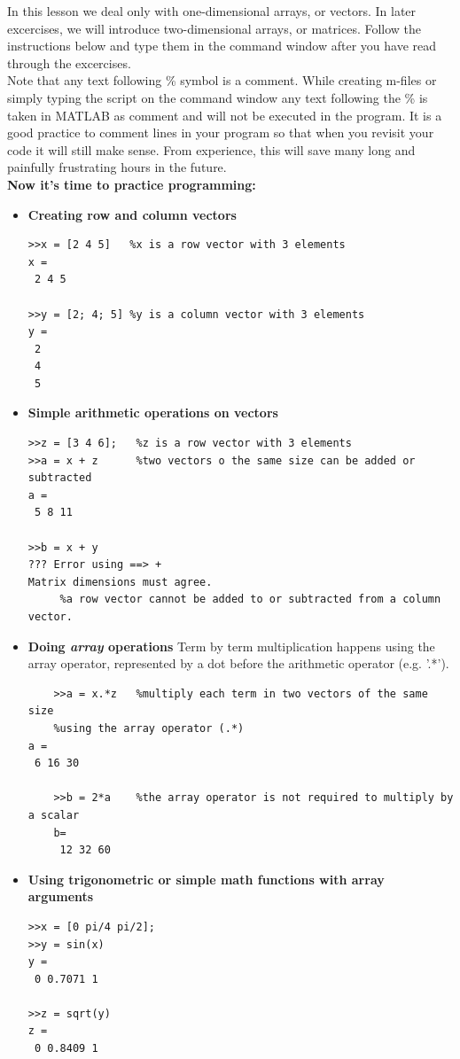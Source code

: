 \documentclass[paper=a4, fontsize=11pt]{scrartcl} %
\numberwithin{equation}{section} %
\numberwithin{figure}{section} %
\numberwithin{table}{section} %
\begin{document}
In this lesson we deal only with one-dimensional arrays, or vectors.
In later excercises, we will introduce two-dimensional arrays, or matrices. 
Follow the instructions below and type them in the command window after you have read through the excercises.\\

Note that any text following \% symbol is a comment. 
While creating m-files or simply typing
the script on the command window any text following the \% is taken in MATLAB as comment and will not be executed in the program. 
It is a good practice to comment lines in your program so that when you revisit your code it will still make sense. 
From experience, this will save many long and painfully frustrating hours in the future.\\

\textbf{Now it's time to practice programming:}

\begin{itemize}
\item \textbf{Creating row and column vectors}
\begin{verbatim}
>>x = [2 4 5]	%x is a row vector with 3 elements
x =
 2 4 5
 
>>y = [2; 4; 5]	%y is a column vector with 3 elements
y =
 2
 4
 5 
\end{verbatim}

\item \textbf{Simple arithmetic operations on vectors}
\begin{verbatim}
>>z = [3 4 6];	 %z is a row vector with 3 elements
>>a = x + z		 %two vectors o the same size can be added or subtracted
a = 
 5 8 11
 
>>b = x + y
??? Error using ==> +
Matrix dimensions must agree.
	 %a row vector cannot be added to or subtracted from a column vector. 
\end{verbatim}

\item \textbf{Doing \textit{array} operations}
Term by term multiplication happens using the array operator, represented by a dot before the arithmetic operator (e.g. '.*').
\begin{verbatim}
	>>a = x.*z	 %multiply each term in two vectors of the same size
	%using the array operator (.*)
a = 
 6 16 30
 
	>>b = 2*a 	 %the array operator is not required to multiply by a scalar
	b=
	 12 32 60
\end{verbatim}


\item \textbf{Using trigonometric or simple math functions with array arguments}
\begin{verbatim}
>>x = [0 pi/4 pi/2];
>>y = sin(x)
y = 
 0 0.7071 1
 
>>z = sqrt(y)
z = 
 0 0.8409 1
\end{verbatim}


\end{itemize}
\end{document}
